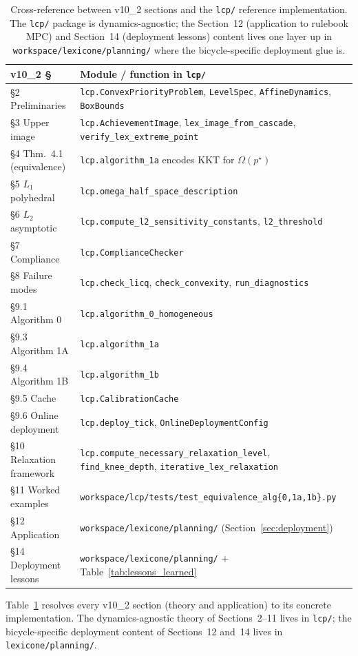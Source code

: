 \begin{table}[h]
    \centering
    \caption{Cross-reference between v10\_2 sections and the \texttt{lcp/} reference implementation. The \texttt{lcp/} package is dynamics-agnostic; the Section~12 (application to rulebook MPC) and Section~14 (deployment lessons) content lives one layer up in \texttt{workspace/lexicone/planning/} where the bicycle-specific deployment glue is.}
    \label{tab:framework_section_map}
    \footnotesize
    \begin{tabularx}{\linewidth}{@{}l X@{}}
        \toprule
        v10\_2 \S\ & Module / function in \texttt{lcp/} \\
        \midrule
        \S2 Preliminaries          & \texttt{lcp.ConvexPriorityProblem}, \texttt{LevelSpec}, \texttt{AffineDynamics}, \texttt{BoxBounds} \\
        \S3 Upper image            & \texttt{lcp.AchievementImage}, \texttt{lex\_image\_from\_cascade}, \texttt{verify\_lex\_extreme\_point} \\
        \S4 Thm.~4.1 (equivalence) & \texttt{lcp.algorithm\_1a} encodes KKT for $\Omega(p^\star)$ \\
        \S5 $L_1$ polyhedral       & \texttt{lcp.omega\_half\_space\_description} \\
        \S6 $L_2$ asymptotic       & \texttt{lcp.compute\_l2\_sensitivity\_constants}, \texttt{l2\_threshold} \\
        \S7 Compliance             & \texttt{lcp.ComplianceChecker} \\
        \S8 Failure modes          & \texttt{lcp.check\_licq}, \texttt{check\_convexity}, \texttt{run\_diagnostics} \\
        \S9.1 Algorithm 0          & \texttt{lcp.algorithm\_0\_homogeneous} \\
        \S9.3 Algorithm 1A         & \texttt{lcp.algorithm\_1a} \\
        \S9.4 Algorithm 1B         & \texttt{lcp.algorithm\_1b} \\
        \S9.5 Cache                & \texttt{lcp.CalibrationCache} \\
        \S9.6 Online deployment    & \texttt{lcp.deploy\_tick}, \texttt{OnlineDeploymentConfig} \\
        \S10 Relaxation framework  & \texttt{lcp.compute\_necessary\_relaxation\_level}, \texttt{find\_knee\_depth}, \texttt{iterative\_lex\_relaxation} \\
        \S11 Worked examples       & \texttt{workspace/lcp/tests/test\_equivalence\_alg\{0,1a,1b\}.py} \\
        \S12 Application           & \texttt{workspace/lexicone/planning/} (Section~\ref{sec:deployment}) \\
        \S14 Deployment lessons    & \texttt{workspace/lexicone/planning/} + Table~\ref{tab:lessons_learned} \\
        \bottomrule
    \end{tabularx}
\end{table}

Table~\ref{tab:framework_section_map} resolves every v10\_2 section (theory and application) to its concrete implementation. The dynamics-agnostic theory of Sections~2--11 lives in \texttt{lcp/}; the bicycle-specific deployment content of Sections~12 and~14 lives in \texttt{lexicone/planning/}.
